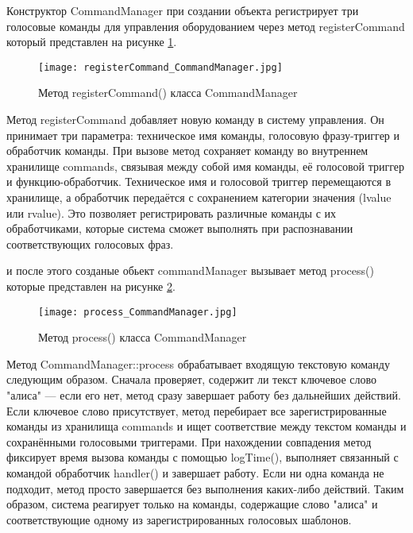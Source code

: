 Конструктор CommandManager при создании объекта регистрирует три голосовые команды для управления оборудованием через метод registerCommand который представлен на рисунке \ref{fig:registerCommand_CommandManager}.

\begin{figure}[H]
	\centering
	\texttt{[image: registerCommand\_CommandManager.jpg]}
	\caption{Метод registerCommand()  класса CommandManager}
	\label{fig:registerCommand_CommandManager}
\end{figure}

Метод registerCommand добавляет новую команду в систему управления. Он принимает три параметра: техническое имя команды, голосовую фразу-триггер и обработчик команды. При вызове метод сохраняет команду во внутреннем хранилище commands, связывая между собой имя команды, её голосовой триггер и функцию-обработчик. Техническое имя и голосовой триггер перемещаются в хранилище, а обработчик передаётся с сохранением категории значения (lvalue или rvalue). Это позволяет регистрировать различные команды с их обработчиками, которые система сможет выполнять при распознавании соответствующих голосовых фраз.

 и после этого созданые обьект commandManager вызывает метод process() которые представлен на рисунке \ref{fig:process_CommandManager}.

\begin{figure}[H]
	\centering
	\texttt{[image: process\_CommandManager.jpg]}
	\caption{Метод process()  класса CommandManager}
	\label{fig:process_CommandManager}
\end{figure}

Метод CommandManager::process обрабатывает входящую текстовую команду следующим образом. Сначала проверяет, содержит ли текст ключевое слово "алиса" — если его нет, метод сразу завершает работу без дальнейших действий. Если ключевое слово присутствует, метод перебирает все зарегистрированные команды из хранилища commands и ищет соответствие между текстом команды и сохранёнными голосовыми триггерами. При нахождении совпадения метод фиксирует время вызова команды с помощью logTime(), выполняет связанный с командой обработчик handler() и завершает работу. Если ни одна команда не подходит, метод просто завершается без выполнения каких-либо действий. Таким образом, система реагирует только на команды, содержащие слово "алиса" и соответствующие одному из зарегистрированных голосовых шаблонов.

\newpage
